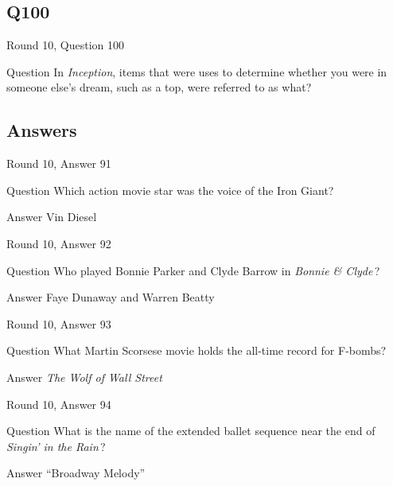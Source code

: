 \documentclass[11pt]{beamer}
\begin{document}
\subsection*{Q100}
\begin{frame}[t]{Round 10, Question 100}
\vspace{2em}
\begin{block}{Question}
In \emph{Inception}, items that were uses to determine whether you were in someone else's dream, such as a top, were referred to as what?
\end{block}
\end{frame}
    
\subsection{Answers}

\begin{frame}[t]{Round 10, Answer 91}
\vspace{2em}
\begin{block}{Question}
Which action movie star was the voice of the Iron Giant?
\end{block}
\pause{}
\begin{block}{Answer}
Vin Diesel
\end{block}
\end{frame}
    

\begin{frame}[t]{Round 10, Answer 92}
\vspace{2em}
\begin{block}{Question}
Who played Bonnie Parker and Clyde Barrow in \emph{Bonnie \& Clyde}\,?
\end{block}
\pause{}
\begin{block}{Answer}
Faye Dunaway and Warren Beatty
\end{block}
\end{frame}
    

\begin{frame}[t]{Round 10, Answer 93}
\vspace{2em}
\begin{block}{Question}
What Martin Scorsese movie holds the all-time record for F-bombs?
\end{block}
\pause{}
\begin{block}{Answer}
\emph{The Wolf of Wall Street}
\end{block}
\end{frame}
    

\begin{frame}[t]{Round 10, Answer 94}
\vspace{2em}
\begin{block}{Question}
What is the name of the extended ballet sequence near the end of \emph{Singin' in the Rain}\,?
\end{block}
\pause{}
\begin{block}{Answer}
``Broadway Melody''
\end{block}
\end{frame}
    
\end{document}
